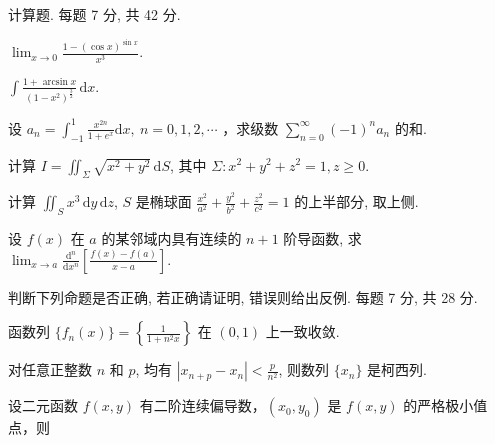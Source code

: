\par{}
计算题. 每题 7 分, 共 42 分.\par
$\lim_{x\to 0}\frac{1 - (\cos x)^{\sin x}}{x^3}.$\par
$\int \frac{1 + \arcsin x}{(1 - x^2)^{\frac{3}{2}}} \, \mathrm{d}x.$\par
设  $a_{n}=\int_{-1}^{1}\frac{x^{2n}}{1+e^{x}}\mathrm{d}x,\ n=0,1,2,\cdots$ ，求级数  $\sum_{n=0}^{\infty}(-1)^{n}a_{n}$  的和.\par
计算 $I = \iint_{\Sigma} \sqrt{x^2 + y^2} \, \mathrm{d}S$, 其中 $\Sigma: x^2 + y^2 + z^2 = 1, z \geq 0$.\par
计算 $\iint_{S} x^{3} \, \mathrm{d}y \, \mathrm{d}z$, $S$ 是椭球面 $\frac{x^{2}}{a^{2}} + \frac{y^{2}}{b^{2}} + \frac{z^{2}}{c^{2}} = 1$ 的上半部分, 取上侧.\par
设 $f(x)$ 在 $a$ 的某邻域内具有连续的 $n + 1$ 阶导函数, 求 $\lim_{x \to a} \frac{\mathrm{d}^n}{\mathrm{d}x^n} \left[ \frac{f(x) - f(a)}{x - a} \right]$.\par
\par{}
判断下列命题是否正确, 若正确请证明, 错误则给出反例. 每题 7 分, 共 28 分.\par
函数列 $\{f_n(x)\} = \left\{\frac{1}{1 + n^2x}\right\}$ 在 $(0,1)$ 上一致收敛.\par
对任意正整数 $n$ 和 $p$, 均有 $|x_{n+p} - x_n| < \frac{p}{n^2}$, 则数列 $\{x_n\}$ 是柯西列.\par
\par{}
设二元函数 $f(x, y)$ 有二阶连续偏导数，$(x_0, y_0)$ 是 $f(x, y)$ 的严格极小值点，则\par
